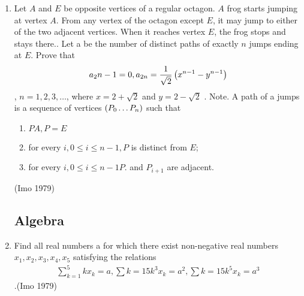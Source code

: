 \begin{enumerate}
	\item Let $A$ and $E$ be opposite vertices of a regular octagon. $A$ frog starts jumping at vertex $A$. From any vertex of the octagon except $E$, it may jump to either of the two adjacent vertices. When it reaches vertex $E$, the frog stops and stays there.. Let a be the number of distinct paths of exactly $n$ jumps ending at $E$. Prove that 
\begin{align}a_2n-1=0, a_{2n} = \frac{1}{\sqrt{2}}\left(x^{n - 1} - y^{n - 1}\right)\end{align},
$n = 1, 2, 3 ,\ldots$,
	where $x = 2 + \sqrt{2}$ and $y = 2 - \sqrt{2}$ . Note. A path of a jumps is a sequence of vertices $\left(P_0\ldots P_n\right)$ such that
\begin{enumerate}
	\item $PA, P = E$
\item for every $i, 0 \leq i \leq n - 1, P$ is distinct from $E$;
\item for every $i, 0 \leq i \leq n - 1 P$. and $P_{i+1}$ are adjacent.\end{enumerate}\hfill(Imo 1979)
	\subsection*{ Algebra}  
\item Find all real numbers a for which there exist non-negative real numbers $x_1, x_2, x_3, x_4,x_5$ satisfying the relations \begin{align}\sum_{k=1}^{5}kx_{k}=a,\sum{k=1}{5}k^{3}x_{k}=a^2,\sum{k=1}{5}k^{5}x_{k}=a^3\end{align}.\hfill(Imo 1979)
\end{enumerate}
